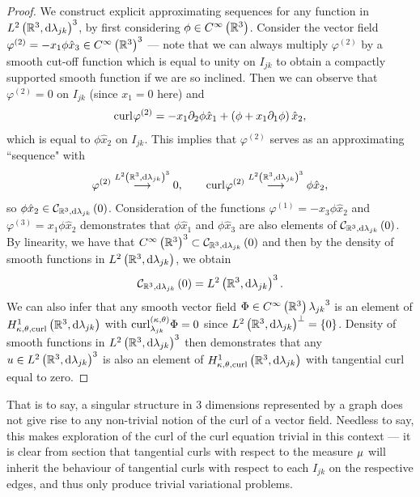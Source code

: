 \begin{proof}
	We construct explicit approximating sequences for any function in $L^{2}\left( \mathbb{R}^3,\mathrm{d} \lambda_{jk} \right)^3$, by first considering $\phi\in C^{\infty}\left( \mathbb{R}^3 \right)$.
	Consider the vector field $\varphi^{(2)} = -x_1\phi\hat{x}_3\in C^{\infty}\left( \mathbb{R}^3 \right)^3$ --- note that we can always multiply $\varphi^{(2)}$ by a smooth cut-off function which is equal to unity on $I_{jk}$ to obtain a compactly supported smooth function if we are so inclined.
	Then we can observe that $\varphi^{(2)}=0$ on $I_{jk}$ (since $x_1=0$ here) and 
	\begin{align*}
		\mathrm{curl}_{}\varphi^{(2)} = -x_1\partial_2\phi\hat{x}_1 + \left( \phi + x_1\partial_1\phi \right)\hat{x}_2,
	\end{align*}
	which is equal to $\phi\hat{x}_2$ on $I_{jk}$.
	This implies that $\varphi^{(2)}$ serves as an approximating ``sequence" with
	\begin{align*}
		\varphi^{(2)} \overset{L^{2}\left( \mathbb{R}^3,\mathrm{d} \lambda_{jk} \right)^3}{\longrightarrow} 0, 
		\qquad
		\mathrm{curl}_{}\varphi^{(2)} \overset{L^{2}\left( \mathbb{R}^3,\mathrm{d} \lambda_{jk} \right)^3}{\longrightarrow} \phi\hat{x}_2,
	\end{align*}
	so $\phi\hat{x}_2\in\mathcal{C}_{ \mathbb{R}^3, \mathrm{d}\lambda_{jk}}\left( 0 \right)$.
	Consideration of the functions $\varphi^{(1)} = -x_3\phi\hat{x}_2$ and $\varphi^{(3)}=x_1\phi\hat{x}_2$ demonstrates that $\phi\hat{x}_1$ and $\phi\hat{x}_3$ are also elements of $\mathcal{C}_{ \mathbb{R}^3, \mathrm{d}\lambda_{jk}}\left( 0 \right)$.
	By linearity, we have that $C^{\infty}\left( \mathbb{R}^3 \right)^3\subset\mathcal{C}_{ \mathbb{R}^3, \mathrm{d}\lambda_{jk}}\left( 0 \right)$ and then by the density of smooth functions in $L^{2}\left( \mathbb{R}^3,\mathrm{d} \lambda_{jk} \right)$, we obtain
	\begin{align*}
		\mathcal{C}_{ \mathbb{R}^3, \mathrm{d}\lambda_{jk}}\left( 0 \right) = L^{2}\left( \mathbb{R}^3,\mathrm{d} \lambda_{jk} \right)^3.
	\end{align*}
	We can also infer that any smooth vector field $\Phi\in C^{\infty}\left( \mathbb{R}^3 \right){\lambda_{jk}}^3$ is an element of $H^1_{\kappa,\theta,\mathrm{curl}}\left( \mathbb{R}^3, \mathrm{d}\lambda_{jk} \right)$ with $\mathrm{curl}_{\lambda_{jk}}^{\left( \kappa, \theta \right)}\Phi = 0$ since $L^{2}\left( \mathbb{R}^3,\mathrm{d} \lambda_{jk} \right)^{\perp} = \left\{ 0 \right\}$.
	Density of smooth functions in $L^{2}\left( \mathbb{R}^3,\mathrm{d} \lambda_{jk} \right)^3$ then demonstrates that any $u\in L^{2}\left( \mathbb{R}^3,\mathrm{d} \lambda_{jk} \right)^3$ is also an element of $H^1_{\kappa,\theta,\mathrm{curl}}\left( \mathbb{R}^3, \mathrm{d}\lambda_{jk} \right)$ with tangential curl equal to zero.
\end{proof}

That is to say, a singular structure in 3 dimensions represented by a graph does not give rise to any non-trivial notion of the curl of a vector field.
Needless to say, this makes exploration of the curl of the curl equation trivial in this context --- it is clear from section  that tangential curls with respect to the measure $\mu$ will inherit the behaviour of tangential curls with respect to each $I_{jk}$ on the respective edges, and thus only produce trivial variational problems.

